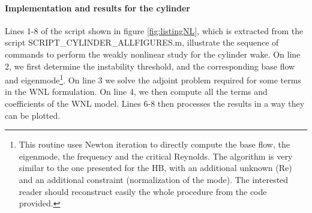 \documentclass[twocolumn,10pt]{asme2ej}
\begin{document}


\paragraph{Implementation and results for the cylinder}




Lines 1-8 of the script shown in figure \ref{fig:listingNL}, which is extracted from the script 
{\sf SCRIPT\_CYLINDER\_ALLFIGURES.m}, illustrate the sequence of commands to 
perform the weakly nonlinear study for the cylinder wake.
On line 2, we first determine the instability threshold, and the corresponding base flow and eigenmode\footnote{This routine uses Newton iteration to directly compute the base flow, the eigenmode, the frequency and the critical Reynolds. The algorithm is very similar to the one presented for the HB, with an additional unknown (Re) and an additional constraint (normalization of the mode). The interested reader should reconstruct easily the whole procedure from the code provided.}. 
On line 3 we solve the adjoint problem required for some terms in the WNL formulation.
On line 4, we then compute all the terms and coefficients of the WNL model.
Lines 6-8 then processes the results in a way they can be plotted.

\end{document}
